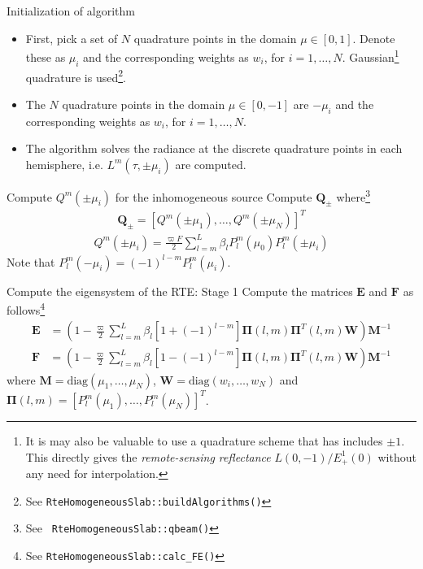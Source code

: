 \documentclass[14]{beamer}
\newcommand{\mvec}[1]{\mathbf{#1}}
\newcommand{\gvec}[1]{\boldsymbol{#1}}
\begin{document}
\begin{frame}{Initialization of algorithm}
  \begin{itemize}
  \item First, pick a set of $N$ quadrature points in the domain $\mu
    \in[0,1]$. Denote these as $\mu_i$ and the corresponding weights
    as $w_i$, for $i=1,\ldots,N$. Gaussian\footnote{It is may also be
      valuable to use a quadrature scheme that has includes $\pm
      1$. This directly gives the \emph{remote-sensing reflectance}
      $L(0,-1)/E_+^1(0)$ without any need for interpolation.}
    quadrature is used\footnote{See {\tt RteHomogeneousSlab::buildAlgorithms()}}.
  \item The $N$ quadrature points in the domain $\mu \in[0,-1]$ are
    $-\mu_i$ and the corresponding weights as $w_i$, for
    $i=1,\ldots,N$.
  \item The algorithm solves the radiance at the discrete quadrature
    points in each hemisphere, i.e. $L^m(\tau,\pm \mu_i)$ are
    computed.
  \end{itemize}
  
\end{frame}

\begin{frame}{Compute $Q^m(\pm \mu_i)$ for the inhomogeneous source}
  Compute $\mvec{Q}_\pm$ where\footnote{See {\tt
      RteHomogeneousSlab::qbeam()}}
  \begin{align}
    \mvec{Q}_\pm = [Q^m(\pm\mu_1), \ldots, Q^m(\pm\mu_N)]^T
  \end{align}
  \begin{align}
    Q^m(\pm \mu_i) = \frac{\varpi F}{2}
    \sum_{l=m}^L \beta_l P^m_l(\mu_0) P_l^m(\pm \mu_i)
  \end{align}
  Note that $P_l^m(-\mu_i) = (-1)^{l-m}P_l^m(\mu_i)$.
\end{frame}

\begin{frame}{Compute the eigensystem of the RTE: Stage 1}
  Compute the matrices $\mvec{E}$ and $\mvec{F}$ as
  follows\footnote{See {\tt RteHomogeneousSlab::calc\_FE()}}
  \begin{align}
    \mvec{E} &= \left(
      1-\frac{\varpi}{2}\sum_{l=m}^L
    \beta_l
    \left[1+(-1)^{l-m}\right] 
    \gvec{\Pi}(l,m) \gvec{\Pi}^T(l,m) \mvec{W}
    \right)
    \mvec{M}^{-1}
  \end{align}
  \begin{align}
    \mvec{F} &= \left(
      1-\frac{\varpi}{2}\sum_{l=m}^L
    \beta_l
    \left[1-(-1)^{l-m}\right] 
    \gvec{\Pi}(l,m) \gvec{\Pi}^T(l,m) \mvec{W}
    \right)
    \mvec{M}^{-1}
  \end{align}
  where $\mvec{M} = \textrm{diag}(\mu_1,\ldots,\mu_N)$, $\mvec{W} =
  \textrm{diag}(w_i,\ldots,w_N)$ and $\gvec{\Pi}(l,m) =
  [P_l^m(\mu_1),\ldots,P_l^m(\mu_N)]^T$.
\end{frame}
\end{document}
